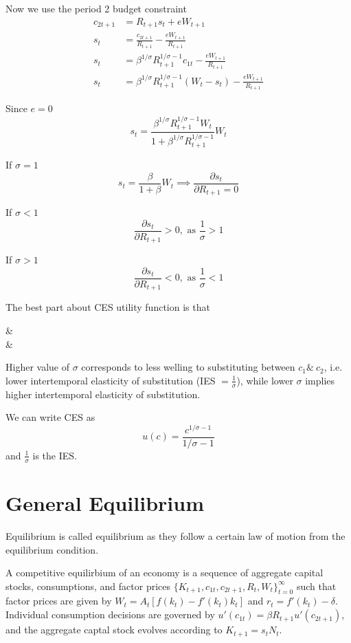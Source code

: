 \documentclass[twocolumn, fleqn]{article}
\begin{document}
				Now we use the period 2 budget constraint
				\begin{align*}
					c_{2t+1} &= R_{t+1}s_t + eW_{t+1}\\
					s_t &= \frac{c_{2t+1}}{R_{t+1}} - \frac{eW_{t+1}}{R_{t+1}}\\
					s_t &= \beta^{1/\sigma} R_{t+1}^{1/\sigma -1}c_{1t}- \frac{eW_{t+1}}{R_{t+1}}\\
					s_t &= \beta^{1/\sigma} R_{t+1}^{1/\sigma -1}(W_t - s_t)- \frac{eW_{t+1}}{R_{t+1}}
				\end{align*}

				Since $e=0$
				\[s_t = \frac{\beta^{1/\sigma}R_{t+1}^{1/\sigma-1}W_t}{1+\beta^{1/\sigma}R_{t+1}^{1/\sigma-1}}W_t\]

				If $\sigma =1$
				\[s_t = \frac{\beta}{1+\beta}W_t \implies \frac{\partial s_t}{\partial R_{t+1}=0}\]

				If $\sigma <1$
				\[\frac{\partial s_t}{\partial R_{t+1}}>0, \text{ as } \frac{1}{\sigma}>1\]

				If $\sigma >1$
				\[\frac{\partial s_t}{\partial R_{t+1}}<0, \text{ as } \frac{1}{\sigma}<1\]

				The best part about CES utility function is that
				\begin{cases}
					\sigma {}  \implies & \\
					\sigma \rightarrow \infty  \implies & 
				\end{cases}

				Higher value of $\sigma$ corresponds to less welling to substituting between $c_1 \& \ c_2$, i.e.
				lower intertemporal elasticity of substitution (IES $= \frac{1}{\sigma}$), while lower $\sigma
				$ implies higher intertemporal elasticity of substitution.

				We can write CES as \[u(c) = \frac{c^{1/\sigma-1}}{1/\sigma-1}\]
				and $\frac{1}{\sigma}$ is the IES.

	\section{General Equilibrium}\label{sec:general-equilibrium}

		Equilibrium is called equilibrium as they follow a certain law of motion from the equilibrium condition.

		A competitive equilirbium of an economy is a sequence of aggregate capital stocks, consumptions, and factor
		prices $\{K_{t+1}, c_{1t}, c_{2t+1}, R_t, W_t\}_{t=0}^{\infty}$ such that factor prices are given by
		$W_t = A_t[f(k_t)-f'(k_t)k_t]$ and $r_t = f'(k_t)-\delta$.
		Individual consumption decisions are governed by $u'(c_{1t})=\beta R_{t+1}u'(c_{2t+1})$, and the aggregate
		captal stock evolves according to $K_{t+1}=s_t N_t$.
\end{document}
